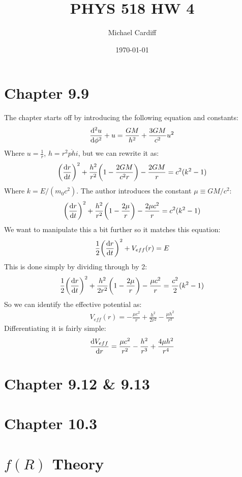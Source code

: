 \documentclass[12pt]{article}
\title{\vspace{-3em}PHYS 518 HW 4}
\author{Michael Cardiff}
\date{\today}
\begin{document}
\maketitle

\section{Chapter 9.9}
The chapter starts off by introducing the following equation and constants:
\begin{align*}
  \dv[2]{u}{\phi}+u=\frac{GM}{h^2}+\frac{3GM}{c^2}u^2
\end{align*}
Where $u=\frac{1}{r}$, $h=r^2\dot{phi}$, but we can rewrite it as:
\begin{align*}
  \qty(\dv{r}{t})^2+\frac{h^2}{r^2}\qty(1-\frac{2GM}{c^2r})-\frac{2GM}{r}=
  c^2(k^2-1)
\end{align*}
Where $k=E/(m_0c^2)$. The author introduces the constant $\mu\equiv GM/c^2$:
\begin{align*}
  \qty(\dv{r}{t})^2+\frac{h^2}{r^2}\qty(1-\frac{2\mu}{r})-\frac{2\mu c^2}{r}=
  c^2(k^2-1)
\end{align*}
We want to manipulate this a bit further so it matches this equation:
\begin{align*}
  \frac{1}{2}\qty(\dv{r}{t})^2+V_{eff}(r)=E
\end{align*}
This is done simply by dividing through by 2:
\begin{align*}
  \frac{1}{2}\qty(\dv{r}{t})^2
  +\frac{h^2}{2r^2}\qty(1-\frac{2\mu}{r})
  -\frac{\mu c^2}{r}=\frac{c^2}{2}(k^2-1)
\end{align*}
So we can identify the effective potential as:
\begin{align*}
  V_{eff}(r)=-\frac{\mu c^2}{r}+\frac{h^2}{2r^2}-\frac{\mu h^2}{r^3}
\end{align*}
Differentiating it is fairly simple:
\begin{align*}
  \dv{V_{eff}}{r}=\frac{\mu c^2}{r^2}-\frac{h^2}{r^3}+\frac{4\mu h^2}{r^4}
\end{align*}
\section{Chapter 9.12 \& 9.13}

\section{Chapter 10.3}

\section{$f(R)$ Theory}
\end{document}
